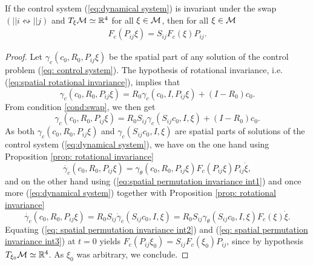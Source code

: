 \begin{proposition}
\label{prop: spatial permutation invariance}
If the control system (\ref{eq:dynamical system}) is invariant under the swap $(||i \leftrightsquigarrow ||j)$ and $T_{\xi} \mathcal{M} \simeq \mathbb{R}^4$ for all $\xi \in \mathcal{M}$, then for all $\xi \in \mathcal{M}$
\begin{align}
	 F_c(P_{ij} \xi) = S_{ij} F_c(\xi) P_{ij}.
\end{align}
\end{proposition}

\begin{proof}
Let $\gamma_c(c_0, R_0, P_{ij} \xi)$ be the spatial part of any solution of the control problem (\ref{eq: control system}). The hypothesis of rotational invariance, i.e. (\ref{eq:spatial rotational invariance}), implies that
\begin{equation}
	\gamma_c(c_0, R_0, P_{ij} \xi) = R_0 \gamma_c(c_0, I, P_{ij} \xi) + (I - R_0)c_0.
\end{equation}
From condition \ref{cond:swap}, we then get
\begin{equation}
\label{eq:spatial permutation invariance int1}
	\gamma_c(c_0, R_0, P_{ij}\xi) = R_0 S_{ij} \gamma_c(S_{ij} c_0, I, \xi) + (I - R_0)c_0.
\end{equation}
As both $\gamma_c(c_0, R_0, P_{ij} \xi)$ and $\gamma_c(S_{ij} c_0, I, \xi)$ are spatial parts of solutions of the control system (\ref{eq:dynamical system}), we have on the one hand using Proposition \ref{prop: rotational invariance}
\begin{equation}
\label{eq: spatial permutation invariance int2}
	\dot{\gamma_c}(c_0, R_0, P_{ij} \xi) = \gamma_{\theta}(c_0, R_0, P_{ij} \xi) F_c(P_{ij} \xi) P_{ij} \dot{\xi},
\end{equation}
and on the other hand using (\ref{eq:spatial permutation invariance int1}) and once more (\ref{eq:dynamical system}) together with Proposition \ref{prop: rotational invariance}
\begin{equation}
\label{eq: spatial permutation invariance int3}
	\dot{\gamma_c}(c_0, R_0, P_{ij} \xi) = R_0 S_{ij} \dot{\gamma}_c(S_{ij} c_0, I, \xi) = R_0 S_{ij} \gamma_\theta(S_{ij} c_0, I, \xi) F_c(\xi) \dot{\xi}.
\end{equation}
Equating (\ref{eq: spatial permutation invariance int2}) and (\ref{eq: spatial permutation invariance int3}) at $t = 0$ yields $ F_c(P_{ij} \xi_0) = S_{ij} F_c(\xi_0) P_{ij}$, since by hypothesis $T_{\xi_0} \mathcal{M} \simeq \mathbb{R}^4$. As $\xi_0$ was arbitrary, we conclude.
\end{proof}

